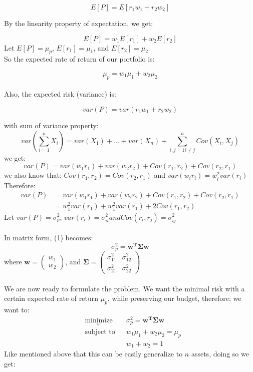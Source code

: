 \documentclass[12pt]{article}
\begin{document}
$$
E[P] = E[r_1w_1 + r_2w_2]
$$

By the linearity property of expectation, we get: 

$$
E[P] = w_1E[r_1] + w_2E[r_2]
$$
Let $E[P] = \mu_p$, $E[r_1] = \mu_1$, and $E[r_2]=\mu_2$ \\
So the expected rate of return of our portfolio is: 

$$
\mu_p = w_1 \mu_1 + w_2 \mu_2
$$
\\
Also, the expected risk (variance) is: 

$$
var(P) = var(r_1w_1 + r_2w_2)
$$

with sum of variance property: $$var(\sum_{i=1}^{n}{X_i}) = var(X_1) + ... + var(X_n) +\sum_{i,j=1 i\neq j}^{n}{Cov(X_i,X_j)}$$
we get: 
$$
var(P) = var(w_1r_1)+var(w_2r_2)+Cov(r_1,r_2)+Cov(r_2,r_1)
$$
we also know that: $Cov(r_1,r_2) = Cov(r_2,r_1)$ and $var(w_ir_i)=w_i^2var(r_i)$ \\
Therefore: 
\begin{equation}
\begin{split}
var(P) &= var(w_1r_1)+var(w_2r_2)+Cov(r_1,r_2)+Cov(r_2,r_1)\\
&= w_1^2var(r_1) + w_1^2var(r_1) + 2Cov(r_1,r_2)
\end{split}
\end{equation}
Let $var(P)=\sigma_p^2$, $var(r_i)=\sigma_{ii}^2 and Cov(r_i,r_j)=\sigma_{ij}^2$ \\ \\
In matrix form, (1) becomes: 
\begin{equation*}
\sigma_p^2 = \mathbf{w^T\Sigma w}
\end{equation*}
where $\mathbf{w} = \begin{pmatrix} w_1 \\ w_2 \end{pmatrix}$, and $\mathbf{\Sigma} = \begin{pmatrix}\sigma_{11}^2 & \sigma_{12}^2 \\ \sigma_{21}^2 & \sigma_{22}^2 \end{pmatrix}$ \\ \\ 
We are now ready to formulate the problem. We want the minimal risk with a certain expected rate of return $\mu_p$, while preserving our budget, therefore; we want to: 
\begin{equation}
\begin{aligned}
& \underset{w}{\text{minimize}}
& &\sigma_p^2 = \mathbf{w^T\Sigma w}\\
& \text{subject to}
& & w_1 \mu_1 + w_2 \mu_2 = \mu_p \\
&&& w_1 + w_2=1
\end{aligned}
\end{equation}
Like mentioned above that this can be easily generalize to $n$ assets, doing so we get: 
\end{document}

